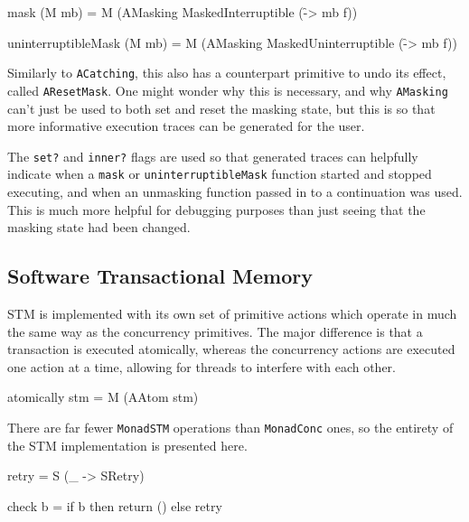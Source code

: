 \begin{haskellcode}
mask (M mb) = M (AMasking MaskedInterruptible (\f -> mb f))

uninterruptibleMask (M mb) = M (AMasking MaskedUninterruptible
  (\f -> mb f))
\end{haskellcode}


Similarly to \verb|ACatching|, this also has a counterpart primitive
to undo its effect, called \verb|AResetMask|. One might wonder why
this is necessary, and why \verb|AMasking| can't just be used to both
set and reset the masking state, but this is so that more informative
execution traces can be generated for the user.


The \verb|set?| and \verb|inner?| flags are used so that generated
traces can helpfully indicate when a \verb|mask| or
\verb|uninterruptibleMask| function started and stopped executing, and
when an unmasking function passed in to a continuation was used. This
is much more helpful for debugging purposes than just seeing that the
masking state had been changed.

\subsection{Software Transactional Memory}
\label{sec:execution-primops-stm}

STM is implemented with its own set of primitive actions which operate
in much the same way as the concurrency primitives. The major
difference is that a transaction is executed atomically, whereas the
concurrency actions are executed one action at a time, allowing for
threads to interfere with each other.

\begin{haskellcode}
atomically stm = M (AAtom stm)
\end{haskellcode}


There are far fewer \verb|MonadSTM| operations than \verb|MonadConc|
ones, so the entirety of the STM implementation is presented here.

\begin{haskellcode}
retry = S (\_ -> SRetry)

check b = if b then return () else retry
\end{haskellcode}

